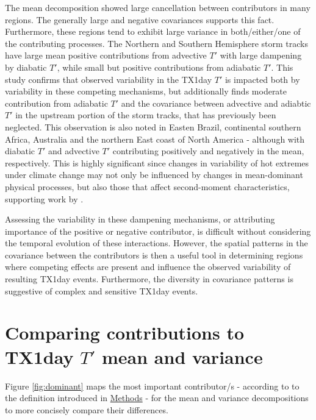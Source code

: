 \documentclass[11pt,a4paper,twoside,openright]{report}
\theoremstyle{definition}
\begin{document}
The mean decomposition showed large cancellation between contributors in many regions. The generally large and negative covariances supports this fact. Furthermore, these regions tend to exhibit large variance in both/either/one of the contributing processes. The Northern and Southern Hemisphere storm tracks have large mean positive contributions from advective \(T'\) with large dampening by diabatic \(T'\), while small but positive contributions from adiabatic \(T'\). This study confirms that observed variability in the TX1day \(T'\) is impacted both by variability in these competing mechanisms, but additionally finds moderate contribution from adiabatic \(T'\) and the covariance between advective and adiabtic \(T'\) in the upstream portion of the storm tracks, that has previously been neglected. This observation is also noted in Easten Brazil, continental southern Africa, Australia and the northern East coast of North America - although with diabatic \(T'\) and advective \(T'\) contributing positively and negatively in the mean, respectively. This is highly significant since changes in variability of hot extremes under climate change may not only be influenced by changes in mean-dominant physical processes, but also those that affect second-moment characteristics, supporting work by \cite{simolo_quantifying_2022}.

Assessing the variability in these dampening mechanisms, or attributing importance of the positive or negative contributor, is difficult without considering the temporal evolution of these interactions. However, the spatial patterns in the covariance between the contributors is then a useful tool in determining regions where competing effects are present and influence the observed variability of resulting TX1day events. Furthermore, the diversity in covariance patterns is suggestive of complex and sensitive TX1day events.

\section{\texorpdfstring{Comparing contributions to TX1day \(T'\) mean and variance}{Comparing contributions to TX1day T\textquotesingle{} mean and variance}}\label{comparing-contributions-to-tx1day-t-mean-and-variance}

Figure \ref{fig:dominant} maps the most important contributor/s - according to to the definition introduced in \hyperref[variance-decomposition-of-tx1day-t]{Methods} - for the mean \citep{rothlisberger_quantifying_2023} and variance decompositions to more concisely compare their differences.
\end{document}
